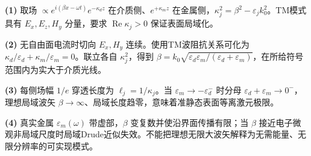 \par\noindent\textbf{(1)} 取场 \(\propto e^{i(\beta x-\omega t)}e^{-\kappa_dz}\) 在介质侧、\(e^{+\kappa_mz}\) 在金属侧，\(\kappa_j^2=\beta^2-\varepsilon_jk_0^2\)。TM模式具有 \(E_x,E_z,H_y\) 分量，要求 \(\operatorname{Re}\kappa_j>0\) 保证表面局域化。
\par\noindent\textbf{(2)} 无自由面电流时切向 \(E_x,H_y\) 连续。使用TM波阻抗关系可化为 \(\kappa_d/\varepsilon_d+\kappa_m/\varepsilon_m=0\)。联立各自 \(\kappa_j^2\)，得到 \(\beta=k_0\sqrt{\varepsilon_d\varepsilon_m/(\varepsilon_d+\varepsilon_m)}\)，在所给符号范围内为实大于介质光线。
\par\noindent\textbf{(3)} 每侧场幅 \(1/e\) 穿透长度为 \(\ell_j=1/\kappa_j\)。当 \(\varepsilon_m\to-\varepsilon_d^-\) 时分母 \(\varepsilon_d+\varepsilon_m\to0^-\)，理想局域波矢 \(\beta\to\infty\)、局域长度趋零，意味着准静态表面等离激元极限。
\par\noindent\textbf{(4)} 真实金属 \(\varepsilon_m(\omega)\) 带虚部，\(\beta\) 变复数并使沿界面传播有限；当 \(\beta\) 接近电子微观非局域尺度时局域Drude近似失效。不能把理想无限大波矢解释为无需能量、无限分辨率的可实现模式。
